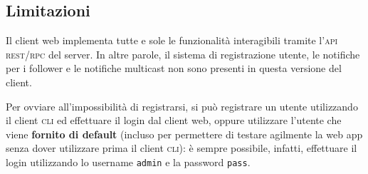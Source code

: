 \documentclass[a4paper,8pt]{article} %
\def\code#1{\texttt{#1}}
\begin{document}
\subsection{Limitazioni}
Il client web implementa tutte e sole le funzionalità interagibili tramite l'\textsc{api} \textsc{rest}/\textsc{rpc} del server.
In altre parole, il sistema di registrazione utente, le notifiche per i follower e le notifiche multicast non sono presenti in questa versione del client.
\par Per ovviare all'impossibilità di registrarsi, si può registrare un utente utilizzando il client \textsc{cli} ed effettuare il login dal client web, oppure utilizzare l'utente
che viene \textbf{fornito di default} (incluso per permettere di testare agilmente la web app senza dover utilizzare prima il client \textsc{cli}): è sempre possibile, infatti, effettuare il login utilizzando lo username \code{admin} e la password \code{pass}.
\end{document}

